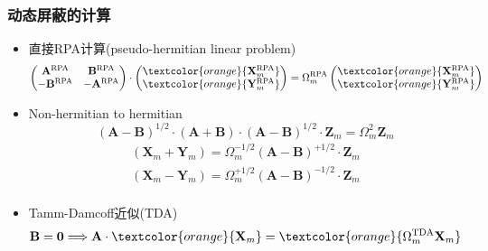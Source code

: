 {\frame
{
	\frametitle{动态屏蔽的计算}
	\begin{itemize}
		\item 直接\textrm{RPA}计算\textrm{(pseudo-hermitian linear problem)}
			\begin{displaymath}
				\begin{aligned}
					\begin{pmatrix}
						\mathbf{A}^{\mathrm{RPA}} &\mathbf{B}^{\mathrm{RPA}}\\
						-\mathbf{B}^{\mathrm{RPA}} &-\mathbf{A}^{\mathrm{RPA}}\\
					\end{pmatrix}
					\cdot
					\begin{pmatrix}
						\textcolor{orange}{	\mathbf{X}_m^{\mathrm{RPA}}}\\
						\textcolor{orange}{\mathbf{Y}_m^{\mathrm{RPA}}}
					\end{pmatrix}=\Omega_{m}^{\mathrm{RPA}}
					\begin{pmatrix}
						\textcolor{orange}{	\mathbf{X}_m^{\mathrm{RPA}}}\\
						\textcolor{orange}{\mathbf{Y}_m^{\mathrm{RPA}}}
					\end{pmatrix}
				\end{aligned}
			\end{displaymath}
			{\fontsize{9.0pt}{6.2pt}}
		\item \textrm{Non-hermitian to hermitian}
			\begin{displaymath}
				(\mathbf{A}-\mathbf{B})^{1/2}\cdot(\mathbf{A}+\mathbf{B})\cdot(\mathbf{A}-\mathbf{B})^{1/2}\cdot\mathbf{Z}_m=\Omega_m^2\mathbf{Z}_m
			\end{displaymath}
			\begin{displaymath}
				\begin{aligned}
					(\mathbf{X}_m+\mathbf{Y}_m)=\Omega_m^{-1/2}(\mathbf{A}-\mathbf{B})^{+1/2}\cdot\mathbf{Z}_m\\
					(\mathbf{X}_m-\mathbf{Y}_m)=\Omega_m^{+1/2}(\mathbf{A}-\mathbf{B})^{-1/2}\cdot\mathbf{Z}_m\\
				\end{aligned}
			\end{displaymath}
		\item \textrm{Tamm-Damcoff}近似\textrm{(TDA)}
			\begin{displaymath}
				\mathbf{B}=\mathbf{0}\Longrightarrow \mathbf{A}\cdot\textcolor{orange}{\mathbf{X}_m}=\textcolor{orange}{\Omega_m^{\mathrm{TDA}}\mathbf{X}_m}
			\end{displaymath}
	\end{itemize}
}

}
